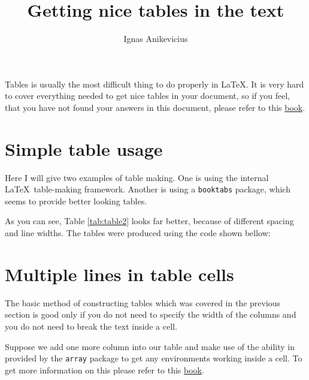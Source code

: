

\usepackage[]{amsmath}
\usepackage{blindtext}
\usepackage{multicol}
\usepackage[english,british]{babel}

\usepackage{stfloats}
\usepackage{booktabs}
\usepackage{array}

\title{Getting nice tables in the text}
\author{Ignas Anikevicius}



\maketitle

Tables is usually the most difficult thing to do properly in \LaTeX . It is very
hard to cover everything needed to get nice tables in your document, so if you
feel, that you have not found your answers in this document, please refer to
this 
\href{https://secure.wikimedia.org/wikibooks/en/wiki/LaTeX/Tables#The_table_environment_-_captioning_etc}{book}.

\section{Simple table usage}

Here I will give two examples of table making. One is using the internal \LaTeX\
table-making framework. Another is using a \verb|booktabs| package, which seems
to provide better looking tables.




As you can see, Table \ref{tab:table2} looks far better, because of different
spacing and line widths. The tables were produced using the code shown bellow:



\section{Multiple lines in table cells}

The basic method of constructing tables which was covered in the previous
section is good only if you do not need to specify the width of the columns and
you do not need to break the text inside a cell.

Suppose we add one more column into our table and make use of the ability in
provided by the \verb|array| package to get any environments working inside a
cell. To get more information on this please refer to this 
\href{https://secure.wikimedia.org/wikibooks/en/wiki/LaTeX/Tables#The_table_environment_-_captioning_etc}{book}.

